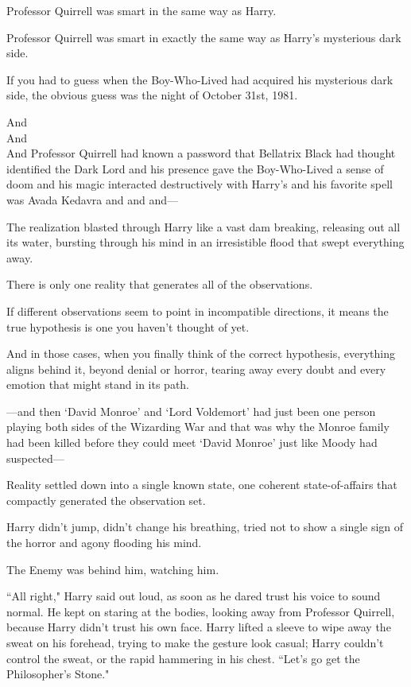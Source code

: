 Professor Quirrell was smart in the same way as Harry.

Professor Quirrell was smart in exactly the same way as Harry's mysterious dark side.

If you had to guess when the Boy-Who-Lived had acquired his mysterious dark side, the obvious guess was the night of October 31st, 1981.

\later

\noindent And\\
And\\
And Professor Quirrell had known a password that Bellatrix Black had thought identified the Dark Lord and his presence gave the Boy-Who-Lived a sense of doom and his magic interacted destructively with Harry's and his favorite spell was Avada Kedavra and and and—

The realization blasted through Harry like a vast dam breaking, releasing out all its water, bursting through his mind in an irresistible flood that swept everything away.

There is only one reality that generates all of the observations.

If different observations seem to point in incompatible directions, it means the true hypothesis is one you haven't thought of yet.

And in those cases, when you finally think of the correct hypothesis, everything aligns behind it, beyond denial or horror, tearing away every doubt and every emotion that might stand in its path.

—and then `David Monroe' and `Lord Voldemort' had just been one person playing both sides of the Wizarding War and that was why the Monroe family had been killed before they could meet `David Monroe' just like Moody had suspected—

Reality settled down into a single known state, one coherent state-of-affairs that compactly generated the observation set.

Harry didn't jump, didn't change his breathing, tried not to show a single sign of the horror and agony flooding his mind.

The Enemy was behind him, watching him.

``All right," Harry said out loud, as soon as he dared trust his voice to sound normal. He kept on staring at the bodies, looking away from Professor Quirrell, because Harry didn't trust his own face. Harry lifted a sleeve to wipe away the sweat on his forehead, trying to make the gesture look casual; Harry couldn't control the sweat, or the rapid hammering in his chest. ``Let's go get the Philosopher's Stone."

